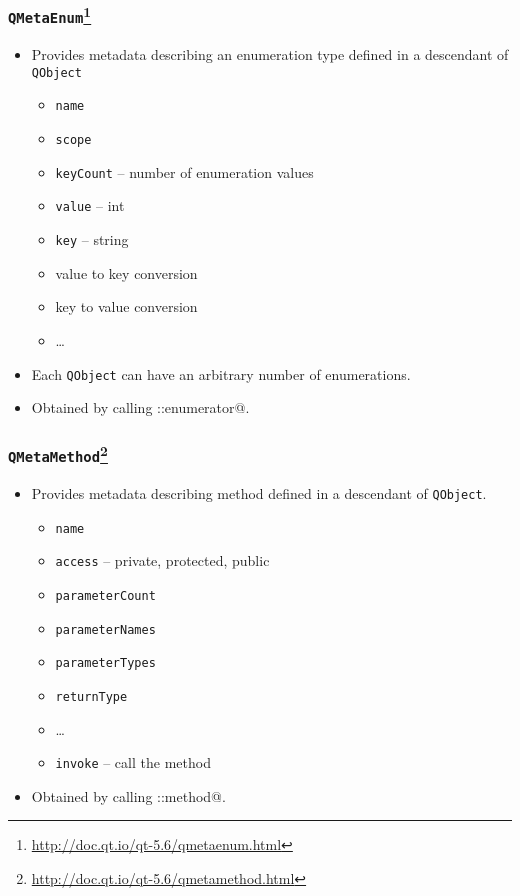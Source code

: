 \begin{frame}[fragile]
  \frametitle{\texttt{QMetaEnum}\footnote
    {\url{http://doc.qt.io/qt-5.6/qmetaenum.html}}}
  \begin{itemize}
    \item Provides metadata describing an enumeration type defined in a descendant
     of \texttt{QObject}
     \begin{itemize}
       \item \texttt{name}
       \item \texttt{scope}
       \item \texttt{keyCount} -- number of enumeration values
       \item \texttt{value} -- int
       \item \texttt{key} -- string
       \item value to key conversion
       \item key to value conversion
       \item \ldots
     \end{itemize}
    \item Each \texttt{QObject} can have an arbitrary number of enumerations.
    \item Obtained by calling \verb@QMetaObject::enumerator@.
  \end{itemize}
\end{frame}

\begin{frame}[fragile]
  \frametitle{\texttt{QMetaMethod}\footnote
    {\url{http://doc.qt.io/qt-5.6/qmetamethod.html}}}
  \begin{itemize}
    \item Provides metadata describing method defined in a descendant of
      \texttt{QObject}.
      \begin{itemize}
        \item \texttt{name}
        \item \texttt{access} -- private, protected, public
        \item \texttt{parameterCount}
        \item \texttt{parameterNames}
        \item \texttt{parameterTypes}
        \item \texttt{returnType}
        \item \ldots
        \item \texttt{invoke} -- call the method
      \end{itemize}
    \item Obtained by calling \verb@QMetaObject::method@.
  \end{itemize}
\end{frame}

